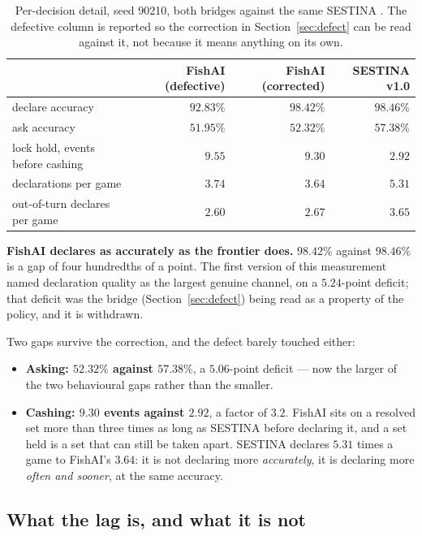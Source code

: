 \documentclass[11pt]{article}
\begin{document}
\begin{table}[t]
\centering
\caption{Per-decision detail, seed 90210, both bridges against the same SESTINA \cite{crossplay}.
The defective column is reported so the correction in Section~\ref{sec:defect} can be read against
it, not because it means anything on its own.}
\label{tab:mechanism}
\footnotesize
\begin{tabular}{@{}lrrr@{}}
\toprule
 & FishAI (defective) & \textbf{FishAI (corrected)} & SESTINA v1.0 \\
\midrule
declare accuracy & $92.83\%$ & $\mathbf{98.42\%}$ & $\mathbf{98.46\%}$ \\
ask accuracy & $51.95\%$ & $\mathbf{52.32\%}$ & $\mathbf{57.38\%}$ \\
lock hold, events before cashing & $9.55$ & $\mathbf{9.30}$ & $\mathbf{2.92}$ \\
declarations per game & $3.74$ & $3.64$ & $5.31$ \\
out-of-turn declares per game & $2.60$ & $2.67$ & $3.65$ \\
\bottomrule
\end{tabular}
\end{table}

\textbf{FishAI declares as accurately as the frontier does.} $98.42\%$ against $98.46\%$ is a gap of
four hundredths of a point. The first version of this measurement named declaration quality as the
largest genuine channel, on a $5.24$-point deficit; that deficit was the bridge
(Section~\ref{sec:defect}) being read as a property of the policy, and it is withdrawn.

Two gaps survive the correction, and the defect barely touched either:

\begin{itemize}
\item \textbf{Asking: $52.32\%$ against $57.38\%$}, a $5.06$-point deficit --- now the larger of the
two behavioural gaps rather than the smaller.
\item \textbf{Cashing: $9.30$ events against $2.92$}, a factor of $3.2$. FishAI sits on a resolved
set more than three times as long as SESTINA before declaring it, and a set held is a set that can
still be taken apart. SESTINA declares $5.31$ times a game to FishAI's $3.64$: it is not declaring
more \emph{accurately}, it is declaring more \emph{often and sooner}, at the same accuracy.
\end{itemize}

\subsection{What the lag is, and what it is not}
\label{sec:lag}
\end{document}
